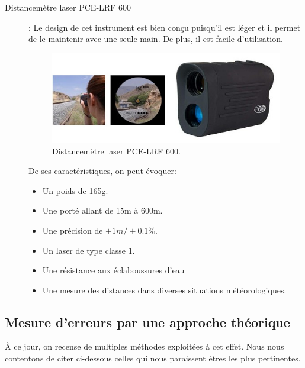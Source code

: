 \documentclass[a4paper, 12pt]{book}
\begin{document}
\begin{description}
	\item[Distancemètre laser PCE-LRF 600]: Le design de cet instrument est bien conçu puisqu'il est léger et il permet de le maintenir avec une seule main. De plus, il est facile d'utilisation. 
\begin{figure}[H]
 	\begin{center}
 		\hspace{2cm}
		\includegraphics[scale=0.65]{images/instrument3.jpg} \hspace{2cm}
		\caption{Distancemètre laser PCE-LRF 600.\label{fig-instrument3}}
  	\end{center}
\end{figure}
De ses caractéristiques, on peut évoquer:
	\begin{itemize}
		\item Un poids de 165g.
		\item Une porté allant de 15m à 600m.
		\item Une précision de $\pm 1m/\pm 0.1\%$.
		\item Un laser de type classe 1.
		\item Une résistance aux éclaboussures d'eau
		\item Une mesure des distances dans diverses situations météorologiques.
	\end{itemize}
	
\end{description}


\subsection{Mesure d'erreurs par une approche théorique}
À ce jour, on recense de multiples méthodes exploitées à cet effet. Nous nous contentons de citer ci-dessous celles qui nous paraissent êtres les plus pertinentes. \\
\end{document}
